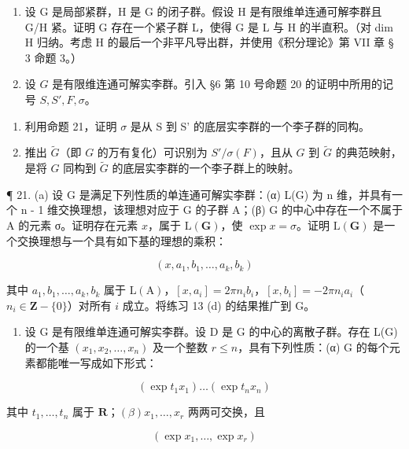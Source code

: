 \begin{enumerate}
\def\labelenumi{\arabic{enumi}.}
\setcounter{enumi}{18}
\item
  设 G 是局部紧群，H 是 G 的闭子群。假设 H 是有限维单连通可解李群且 G/H 紧。证明 G 存在一个紧子群 L，使得 G 是 L 与 H 的半直积。（对 dim H 归纳。考虑 H 的最后一个非平凡导出群，并使用《积分理论》第 VII 章 § 3 命题 3。）
\item
  设 \(G\) 是有限维连通可解实李群。引入 §6 第 10 号命题 20 的证明中所用的记号 \(S, S', F, \sigma\)。
\end{enumerate}

\begin{enumerate}
\def\labelenumi{(\alph{enumi})}
\item
  利用命题 21，证明 \(\sigma\) 是从 S 到 S' 的底层实李群的一个李子群的同构。
\item
  推出 \(\tilde{G}\)（即 \(G\) 的万有复化）可识别为 \(S' / \sigma(F)\)，且从 \(G\) 到 \(\tilde{G}\) 的典范映射，是将 \(G\) 同构到 \(\tilde{G}\) 的底层实李群的一个李子群上的映射。
\end{enumerate}

¶ 21. (a) 设 G 是满足下列性质的单连通可解实李群：(α) L(G) 为 n 维，并具有一个 n - 1 维交换理想，该理想对应于 G 的子群 A；(β) G 的中心中存在一个不属于 A 的元素 σ。证明存在元素 \(x\)，属于 \(\mathrm{L}(\mathbf{G})\)，使 \(\exp x = \sigma\)。证明 \(\mathrm{L}(\mathbf{G})\) 是一个交换理想与一个具有如下基的理想的乘积：

\[
(x, a _ {1}, b _ {1}, \dots , a _ {k}, b _ {k})
\]

 其中 \(a_1, b_1, \ldots, a_k, b_k\) 属于 \(\mathrm{L}(\mathrm{A})\)，\([x, a_i] = 2\pi n_i b_i\)，\([x, b_i] = -2\pi n_i a_i\)（\(n_i \in \mathbf{Z} - \{0\}\)）对所有 \(i\) 成立。将练习 13 (d) 的结果推广到 G。

\begin{enumerate}
\def\labelenumi{(\alph{enumi})}
\setcounter{enumi}{1}
\tightlist
\item
  设 G 是有限维单连通可解实李群。设 D 是 G 的中心的离散子群。存在 L(G) 的一个基 \((x_{1}, x_{2}, \ldots, x_{n})\) 及一个整数 \(r \leqslant n\)，具有下列性质：(α) G 的每个元素都能唯一写成如下形式：
\end{enumerate}

\[
\left(\exp t _ {1} x _ {1}\right) \dots \left(\exp t _ {n} x _ {n}\right)
\]

  其中 \(t_1, \ldots, t_n\) 属于 \(\mathbf{R}\)；\((\beta)x_1, \ldots, x_r\) 两两可交换，且

\[
(\exp x _ {1}, \dots , \exp x _ {r})
\]

